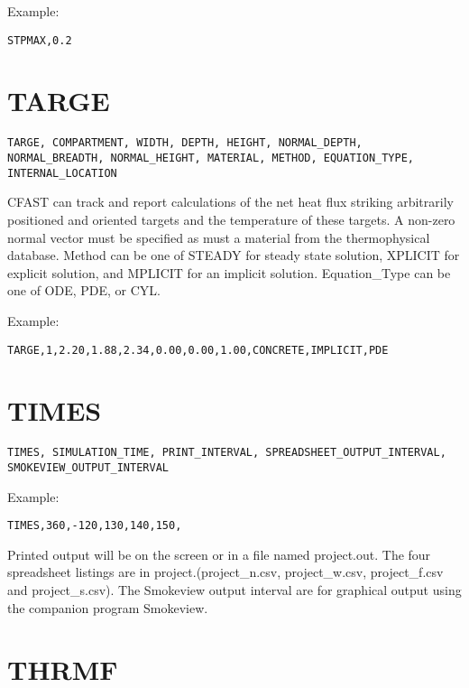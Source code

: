 Example:

\begin{lstlisting}
STPMAX,0.2
\end{lstlisting}

\section{TARGE}

\begin{lstlisting}
TARGE, COMPARTMENT, WIDTH, DEPTH, HEIGHT, NORMAL_DEPTH, NORMAL_BREADTH, NORMAL_HEIGHT, MATERIAL, METHOD, EQUATION_TYPE, INTERNAL_LOCATION
\end{lstlisting}

CFAST can track and report calculations of the net heat flux striking arbitrarily positioned and oriented targets and the temperature of these targets. A non-zero normal vector must be specified as must a material from the thermophysical database. Method can be one of STEADY for steady state solution, XPLICIT for explicit solution, and MPLICIT for an implicit solution. Equation\_Type can be one of ODE, PDE, or CYL.

Example:

\begin{lstlisting}
TARGE,1,2.20,1.88,2.34,0.00,0.00,1.00,CONCRETE,IMPLICIT,PDE
\end{lstlisting}

\section{TIMES}

\begin{lstlisting}
TIMES, SIMULATION_TIME, PRINT_INTERVAL, SPREADSHEET_OUTPUT_INTERVAL, SMOKEVIEW_OUTPUT_INTERVAL
\end{lstlisting}

Example:

\begin{lstlisting}
TIMES,360,-120,130,140,150,
\end{lstlisting}

Printed output will be on the screen or in a file named project.out. The four spreadsheet listings are in project.(project\_n.csv, project\_w.csv, project\_f.csv and project\_s.csv). The Smokeview output interval are for graphical output using the companion program Smokeview.

\section{THRMF}

